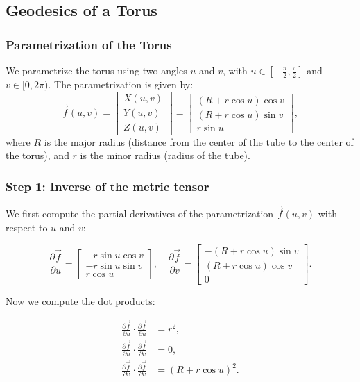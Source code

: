 \documentclass{article}
\begin{document}
		\subsection{Geodesics of a Torus}
			\subsubsection{Parametrization of the Torus}
			
			We parametrize the torus using two angles \( u \) and \( v \), with \( u \in \left[-\frac{\pi}{2}, \frac{\pi}{2}\right] \) and \( v \in [0, 2\pi) \). The parametrization is given by:
			\[
			\vec{f}(u, v) =
			\begin{bmatrix}
				X(u, v) \\
				Y(u, v) \\
				Z(u, v)
			\end{bmatrix}
			=
			\begin{bmatrix}
				(R + r \cos u) \cos v \\
				(R + r \cos u) \sin v \\
				r \sin u
			\end{bmatrix},
			\]
			where \( R \) is the major radius (distance from the center of the tube to the center of the torus), and \( r \) is the minor radius (radius of the tube).
			
			\subsubsection{Step 1: Inverse of the metric tensor}

			We first compute the partial derivatives of the parametrization \( \vec{f}(u, v) \) with respect to \( u \) and \( v \):
			
			\[
			\frac{\partial \vec{f}}{\partial u} =
			\begin{bmatrix}
				- r \sin u \cos v \\
				- r \sin u \sin v \\
				r \cos u
			\end{bmatrix},
			\quad
			\frac{\partial \vec{f}}{\partial v} =
			\begin{bmatrix}
				- (R + r \cos u) \sin v \\
				(R + r \cos u) \cos v \\
				0
			\end{bmatrix}.
			\]
			
			Now we compute the dot products:
			
			\[
			\begin{aligned}
				\frac{\partial \vec{f}}{\partial u} \cdot \frac{\partial \vec{f}}{\partial u} &= r^2, \\
				\frac{\partial \vec{f}}{\partial u} \cdot \frac{\partial \vec{f}}{\partial v} &= 0, \\
				\frac{\partial \vec{f}}{\partial v} \cdot \frac{\partial \vec{f}}{\partial v} &= (R + r \cos u)^2.
			\end{aligned}
			\]
			
\end{document}
